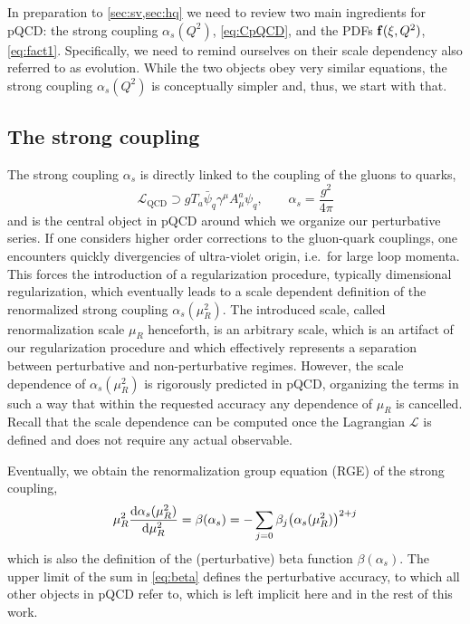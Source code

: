 In preparation to \cref{sec:sv,sec:hq} we need to review two main ingredients for pQCD: the strong coupling $\alpha_s(Q^2)$, \cref{eq:CpQCD}, and the PDFs $\vb f(\xi,Q^2)$, \cref{eq:fact1}.
Specifically, we need to remind ourselves on their scale dependency also referred to as evolution.
While the two objects obey very similar equations, the strong coupling $\alpha_s(Q^2)$ is conceptually simpler and, thus, we start with that.

\subsection{The strong coupling}
\label{sec:as}

The strong coupling $\alpha_s$ is directly linked to the coupling of the gluons to quarks,
\begin{equation}
    \mathcal L_\text{QCD} \supset g T_a \bar{\psi}_q \gamma^\mu A^a_\mu \psi_q, \qquad \alpha_s = \frac{g^2}{4\pi}
\end{equation}
and is the central object in pQCD around which we organize our perturbative series.
If one considers higher order corrections to the gluon-quark couplings, one encounters quickly divergencies of ultra-violet origin, i.e.\ for large loop momenta.
This forces the introduction of a regularization procedure, typically dimensional regularization, which eventually leads to a scale dependent definition of the renormalized strong coupling $\alpha_s(\mu_R^2)$.
The introduced scale, called renormalization scale $\mu_R$ henceforth, is an arbitrary scale, which is an artifact of our regularization procedure and which effectively represents a separation between perturbative and non-perturbative regimes.
However, the scale dependence of $\alpha_s(\mu_R^2)$ is rigorously predicted in pQCD, organizing the terms in such a way that within the requested accuracy any dependence of $\mu_R$ is cancelled.
Recall that the scale dependence can be computed once the Lagrangian $\mathcal L$ is defined and does not require any actual observable.

Eventually, we obtain the renormalization group equation (RGE) of the strong coupling,
\begin{equation}
    \mu_R^2 \dv{\alpha_s(\mu_R^2)}{\mu_R^2} = \beta(\alpha_s) = - \sum_{j=0}\beta_j\qty(\alpha_s(\mu_R^2))^{2+j} \label{eq:beta}
\end{equation}
which is also the definition of the (perturbative) beta function $\beta(\alpha_s)$.
The upper limit of the sum in \cref{eq:beta} defines the perturbative accuracy, to which all other objects in pQCD refer to, which is left implicit here and in the rest of this work.

